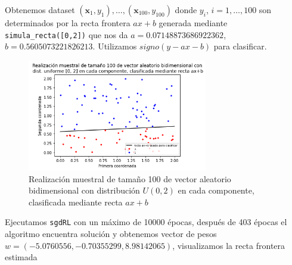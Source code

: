 \documentclass[11pt,a4paper]{article}
\theoremstyle{definition}
\begin{document}
	Obtenemos dataset $(\mathbf{x}_1,y_1),\ldots,(\mathbf{x}_{100},y_{100})$ donde $y_i$, $i=1,\ldots, 100$ son determinados por la recta frontera $ax+b$ generada mediante \texttt{simula\_recta([0,2])} que nos da $a=0.07148873686922362$, $b=0.5605073221826213$. Utilizamos $signo(y-ax-b)$ para clasificar.  %
	
	\begin{figure}[H]
		\centering
		\includegraphics[width=0.7\textwidth]{images/rl1}
		\caption{Realización muestral de tamaño 100 de vector aleatorio bidimensional con distribución $U(0,2)$ en cada componente, clasificada mediante recta $ax+b$}
	\end{figure}
	Ejecutamos \texttt{sgdRL} con un máximo de 10000 épocas, después de 403 épocas el algoritmo encuentra solución y obtenemos vector de pesos $w=(-5.0760556, -0.70355299, 8.98142065)$, visualizamos la recta frontera estimada
	
\end{document}
